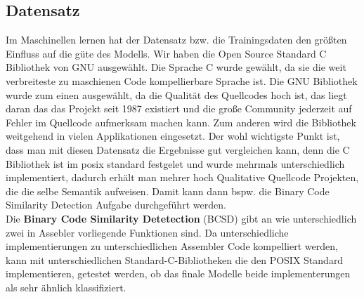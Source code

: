 \documentclass[12pt,letterpaper,ngerman]{article}
\begin{document}
\subsection{Datensatz}
Im Maschinellen lernen hat der Datensatz bzw. die Trainingsdaten den
größten Einfluss auf die güte des Modells. Wir haben die 
Open Source Standard C Bibliothek von GNU ausgewählt.
Die Sprache C wurde gewählt, da sie die weit verbreiteste zu 
maschienen Code kompellierbare Sprache ist. Die GNU Bibliothek 
wurde zum einen ausgewählt, da
die Qualität des Quellcodes hoch ist, das liegt daran das das Projekt 
seit 1987 existiert 
und die große Community jederzeit auf Fehler im Quellcode aufmerksam
machen kann. Zum anderen wird die Bibliothek weitgehend in vielen
Applikationen eingesetzt. Der wohl wichtigste Punkt ist, dass
man mit diesen Datensatz die Ergebnisse gut vergleichen kann, denn
die C Bibliothek ist im posix standard festgelet und wurde mehrmals
unterschiedlich implementiert, dadurch erhält man mehrer hoch Qualitative
Quellcode Projekten, die die selbe Semantik aufweisen. Damit kann dann 
bspw. die Binary Code Similarity Detection Aufgabe durchgeführt werden.\\
Die {\bf Binary Code Similarity Detetection} (BCSD) gibt an wie 
unterschiedlich zwei  in Assebler vorliegende Funktionen sind.
Da unterschiedliche implementierungen zu unterschiedlichen 
Assembler Code kompelliert werden, kann mit unterschiedlichen
Standard-C-Bibliotheken die den POSIX Standard implementieren,
getestet werden, ob das finale Modelle beide implementerungen 
als sehr ähnlich klassifiziert.

\end{document}

